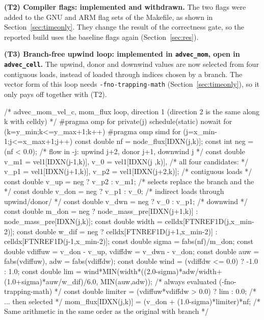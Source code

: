 \documentclass[a4paper,11pt]{article}
\newcommand{\kernel}[1]{\texttt{#1}}
\begin{document}
\textbf{(T2) Compiler flags: implemented and withdrawn.}
The two flags were added to the GNU and ARM flag sets of the Makefile, as shown in Section~\ref{sec:timeonly}.
They change the result of the correctness gate, so the reported build uses the baseline flags again (Section~\ref{sec:res}).

\begin{sloppypar}
\textbf{(T3) Branch-free upwind loop: implemented in \kernel{advec\_mom}, open in \kernel{advec\_cell}.}
The upwind, donor and downwind values are now selected from four contiguous loads, instead of loaded through indices chosen by a branch.
The vector form of this loop needs \texttt{-fno-trapping-math} (Section~\ref{sec:timeonly}), so it only pays off together with (T2).
\end{sloppypar}
\begin{code}
/* advec_mom_vel_c, mom_flux loop, direction 1 (direction 2 is the same along k with celldy) */
#pragma omp for private(j) schedule(static) nowait
for (k=y_min;k<=y_max+1;k++) {
#pragma omp simd
  for (j=x_min-1;j<=x_max+1;j++) {
    const double nf  = node_flux[IDXN(j,k)];
    const int    neg = (nf < 0.0);   /* flow in -j: upwind j+2, donor j+1, downwind j */
    const double v_m1 = vel1[IDXN(j-1,k)], v_0  = vel1[IDXN(j  ,k)],  /* all four candidates: */
                 v_p1 = vel1[IDXN(j+1,k)], v_p2 = vel1[IDXN(j+2,k)];  /* contiguous loads     */
    const double v_up  = neg ? v_p2 : v_m1;      /* selects replace the branch and the      */
    const double v_don = neg ? v_p1 : v_0;       /* indirect loads through upwind/donor/    */
    const double v_dwn = neg ? v_0  : v_p1;      /* downwind                                */
    const double m_don = neg ? node_mass_pre[IDXN(j+1,k)] : node_mass_pre[IDXN(j,k)];
    const double width = celldx[FTNREF1D(j,x_min-2)];
    const double w_dif = neg ? celldx[FTNREF1D(j+1,x_min-2)] : celldx[FTNREF1D(j-1,x_min-2)];
    const double sigma   = fabs(nf)/m_don;
    const double vdiffuw = v_don - v_up,  vdiffdw = v_dwn - v_don;
    const double auw = fabs(vdiffuw), adw = fabs(vdiffdw);
    const double wind = (vdiffdw <= 0.0) ? -1.0 : 1.0;
    const double lim  = wind*MIN(width*((2.0-sigma)*adw/width+(1.0+sigma)*auw/w_dif)/6.0,
                                 MIN(auw,adw));  /* always evaluated (-fno-trapping-math) */
    const double limiter = (vdiffuw*vdiffdw > 0.0) ? lim : 0.0;  /* ... then selected */
    mom_flux[IDXN(j,k)] = (v_don + (1.0-sigma)*limiter)*nf;
  }
}
/* Same arithmetic in the same order as the original with branch */
\end{code}
\end{document}
